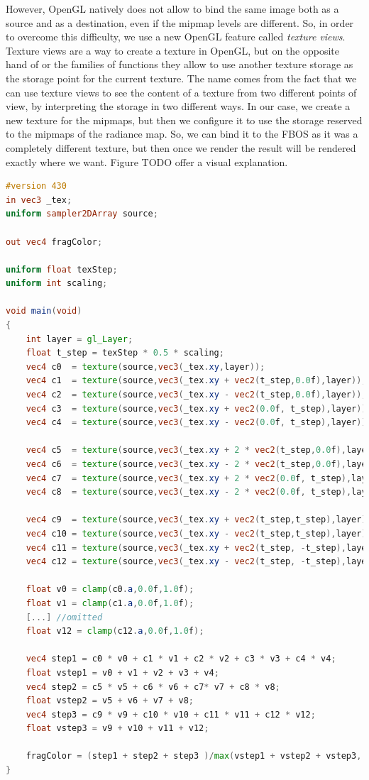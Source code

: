 However, OpenGL natively does not allow to bind the same image both as a source and as a destination, even if the mipmap levels are different. So, in order to overcome this difficulty, we use a new OpenGL feature called \emph{texture views}. Texture views are a way to create a texture in OpenGL, but on the opposite hand of  or the  families of functions they allow to use another texture storage as the storage point for the current texture. The name comes from the fact that we can use texture views to see the content of a texture from two different points of view, by interpreting the storage in two different ways. In our case, we create a new texture for the mipmaps, but then we configure it to use the storage reserved to the mipmaps of the radiance map. So, we can bind it to the FBOS as it was a completely different texture, but then once we render the result will be rendered exactly where we want. Figure TODO offer a visual explanation.

\begin{lstlisting}[language=GLSL,label=lst:shaderimageprocessing,caption={Custom mipmap filtering on GPU. \gl{_tex} are the texture coordinates on the screen aligned quad.}]
#version 430
in vec3 _tex;
uniform sampler2DArray source;

out vec4 fragColor;

uniform float texStep;
uniform int scaling;

void main(void)
{
	int layer = gl_Layer;
	float t_step = texStep * 0.5 * scaling;
	vec4 c0  = texture(source,vec3(_tex.xy,layer));
	vec4 c1  = texture(source,vec3(_tex.xy + vec2(t_step,0.0f),layer));
	vec4 c2  = texture(source,vec3(_tex.xy - vec2(t_step,0.0f),layer));
	vec4 c3  = texture(source,vec3(_tex.xy + vec2(0.0f, t_step),layer));
	vec4 c4  = texture(source,vec3(_tex.xy - vec2(0.0f, t_step),layer));

	vec4 c5  = texture(source,vec3(_tex.xy + 2 * vec2(t_step,0.0f),layer));
	vec4 c6  = texture(source,vec3(_tex.xy - 2 * vec2(t_step,0.0f),layer));
	vec4 c7  = texture(source,vec3(_tex.xy + 2 * vec2(0.0f, t_step),layer));
	vec4 c8  = texture(source,vec3(_tex.xy - 2 * vec2(0.0f, t_step),layer));

	vec4 c9  = texture(source,vec3(_tex.xy + vec2(t_step,t_step),layer));
	vec4 c10 = texture(source,vec3(_tex.xy - vec2(t_step,t_step),layer));
	vec4 c11 = texture(source,vec3(_tex.xy + vec2(t_step, -t_step),layer));
	vec4 c12 = texture(source,vec3(_tex.xy - vec2(t_step, -t_step),layer));

	float v0 = clamp(c0.a,0.0f,1.0f);
	float v1 = clamp(c1.a,0.0f,1.0f);
	[...] //omitted
	float v12 = clamp(c12.a,0.0f,1.0f);

	vec4 step1 = c0 * v0 + c1 * v1 + c2 * v2 + c3 * v3 + c4 * v4;
	float vstep1 = v0 + v1 + v2 + v3 + v4;
	vec4 step2 = c5 * v5 + c6 * v6 + c7* v7 + c8 * v8;
	float vstep2 = v5 + v6 + v7 + v8;
	vec4 step3 = c9 * v9 + c10 * v10 + c11 * v11 + c12 * v12;
	float vstep3 = v9 + v10 + v11 + v12;

	fragColor = (step1 + step2 + step3 )/max(vstep1 + vstep2 + vstep3, 1.0f);
}
\end{lstlisting}

